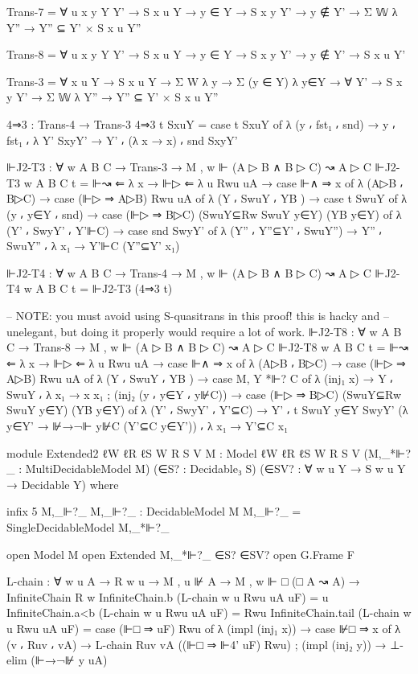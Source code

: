 \begin{spverbatim}
        Trans-7 = ∀ {u x y Y Y'} → S x u Y → y ∈ Y → S x y Y' → y ∉ Y'
          → Σ 𝕎 λ Y'' → Y'' ⊆ Y' × S x u Y''

        Trans-8 = ∀ {u x y Y Y'} → S x u Y → y ∈ Y → S x y Y' → y ∉ Y' → S x u Y'

        Trans-3 = ∀ {x u Y} → S x u Y → Σ W λ y → Σ (y ∈ Y) λ y∈Y → ∀ {Y'} → S x y Y' → Σ 𝕎 λ Y''
          → Y'' ⊆ Y' × S x u Y''

        4⇒3 : Trans-4 → Trans-3
        4⇒3 t SxuY = case t SxuY of λ { (y ⸴ fst₁ ⸴ snd) → y ⸴ fst₁ ⸴
          λ { {Y'} SxyY' → Y' ⸴ (λ x → x) ⸴ snd SxyY'}}

        ⊩J2-T3 : ∀ {w A B C} → Trans-3 → M , w ⊩ (A ▷ B ∧ B ▷ C) ↝ A ▷ C
        ⊩J2-T3 {w} {A} {B} {C} t = ⊩↝ ⇐ λ x → ⊩▷ ⇐ λ {u} Rwu uA → case ⊩∧ ⇒ x of
            λ { (A▷B ⸴ B▷C) → case (⊩▷ ⇒ A▷B) Rwu uA of
            λ { (Y ⸴ SwuY ⸴ YB ) → case t SwuY of
            λ { (y ⸴ y∈Y ⸴ snd) → case (⊩▷ ⇒ B▷C) (SwuY⊆Rw SwuY y∈Y) (YB y∈Y) of
            λ { (Y' ⸴ SwyY' ⸴ Y'⊩C) → case snd SwyY' of
            λ { (Y'' ⸴ Y''⊆Y' ⸴ SwuY'') → Y'' ⸴ SwuY'' ⸴ λ {x₁ → Y'⊩C (Y''⊆Y' x₁)}}}}}}

        ⊩J2-T4 : ∀ {w A B C} → Trans-4 → M , w ⊩ (A ▷ B ∧ B ▷ C) ↝ A ▷ C
        ⊩J2-T4 {w} {A} {B} {C} t = ⊩J2-T3 (4⇒3 t)

        -- NOTE: you must avoid using S-quasitrans in this proof! this is hacky and
        -- unelegant, but doing it properly would require a lot of work.
        ⊩J2-T8 : ∀ {w A B C} → Trans-8 → M , w ⊩ (A ▷ B ∧ B ▷ C) ↝ A ▷ C
        ⊩J2-T8 {w} {A} {B} {C} t = ⊩↝ ⇐ λ x → ⊩▷ ⇐ λ {u} Rwu uA → case ⊩∧ ⇒ x of
            λ { (A▷B ⸴ B▷C) → case (⊩▷ ⇒ A▷B) Rwu uA of
            λ { (Y ⸴ SwuY ⸴ YB ) → case M, Y *⊩? C of
            λ { (inj₁ x) → Y ⸴ SwuY ⸴ λ {x₁ → x x₁} ;
            (inj₂ (y ⸴ y∈Y ⸴ y⊮C)) → case (⊩▷ ⇒ B▷C) (SwuY⊆Rw SwuY y∈Y) (YB y∈Y) of
            λ { (Y' ⸴ SwyY' ⸴ Y'⊆C) → Y' ⸴ t SwuY y∈Y SwyY' (λ {y∈Y' → ⊮→¬⊩ y⊮C (Y'⊆C y∈Y')}) ⸴
            λ {x₁ → Y'⊆C x₁}}}}}

  module Extended2
    {ℓW ℓR ℓS}
    {W R S V}
    {M : Model {ℓW} {ℓR} {ℓS} W R S V}
    (M,_*⊩?_ : MultiDecidableModel M)
    (∈S? : Decidable₃ S)
    (∈SV? : ∀ {w u Y} → S w u Y → Decidable Y) where

    infix 5 M,_⊩?_
    M,_⊩?_ : DecidableModel M
    M,_⊩?_ = SingleDecidableModel M,_*⊩?_

    open Model M
    open Extended M,_*⊩?_ ∈S? ∈SV?
    open G.Frame F

    L-chain : ∀ {w u A} → R w u → M , u ⊮ A → M , w ⊩ □ (□ A ↝ A) → InfiniteChain R w
    InfiniteChain.b (L-chain {w} {u} Rwu uA uF) = u
    InfiniteChain.a<b (L-chain {w} {u} Rwu uA uF) = Rwu
    InfiniteChain.tail (L-chain {w} {u} Rwu uA uF) =
      case (⊩□ ⇒ uF) Rwu of
      λ { (impl (inj₁ x)) → case ⊮□ ⇒ x of
        λ { (v ⸴ Ruv ⸴ vA) → L-chain Ruv vA ((⊩□ ⇒ ⊩4' uF) Rwu)}
      ; (impl (inj₂ y)) → ⊥-elim (⊩→¬⊮ y uA) }


\end{spverbatim}
